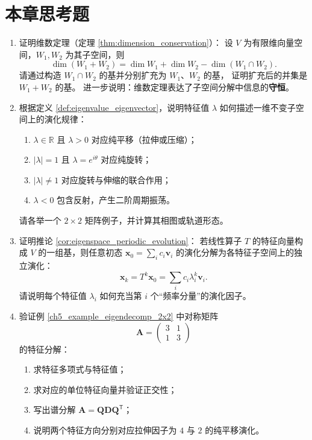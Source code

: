 \section*{本章思考题}

\begin{enumerate}[leftmargin=3em, label=\textbf{题 \arabic*}]
    \item 证明维数定理（定理 \ref{thm:dimension_conservation}）：
    设 $V$ 为有限维向量空间，$W_1,W_2$ 为其子空间，则
    \[
    \dim(W_1+W_2)=\dim W_1+\dim W_2-\dim(W_1\cap W_2).
    \]
    请通过构造 $W_1\cap W_2$ 的基并分别扩充为 $W_1$、$W_2$ 的基，
    证明扩充后的并集是 $W_1+W_2$ 的基。
    进一步说明：维数定理表达了子空间分解中信息的\textbf{守恒}。

    \item 根据定义 \ref{def:eigenvalue_eigenvector}，说明特征值 $\lambda$ 如何描述一维不变子空间上的演化规律：
    \begin{enumerate}[label=(\roman*)]
        \item $\lambda\in\mathbb{R}$ 且 $\lambda>0$ 对应纯平移（拉伸或压缩）；
        \item $|\lambda|=1$ 且 $\lambda=e^{i\theta}$ 对应纯旋转；
        \item $|\lambda|\neq1$ 对应旋转与伸缩的联合作用；
        \item $\lambda<0$ 包含反射，产生二阶周期振荡。
    \end{enumerate}
    请各举一个 $2\times2$ 矩阵例子，并计算其相图或轨道形态。

    \item 证明推论 \ref{cor:eigenspace_periodic_evolution}：
    若线性算子 $T$ 的特征向量构成 $V$ 的一组基，则任意初态
    $\mathbf{x}_0=\sum_i c_i\mathbf{v}_i$ 的演化分解为各特征子空间上的独立演化：
    \[
    \mathbf{x}_k=T^k\mathbf{x}_0=\sum_i c_i\lambda_i^k\mathbf{v}_i.
    \]
    请说明每个特征值 $\lambda_i$ 如何充当第 $i$ 个“频率分量”的演化因子。

    \item 验证例 \ref{ch5_example_eigendecomp_2x2} 中对称矩阵
    \[
    \mathbf{A}=\begin{pmatrix}3&1\\1&3\end{pmatrix}
    \]
    的特征分解：
    \begin{enumerate}[label=(\roman*)]
        \item 求特征多项式与特征值；
        \item 求对应的单位特征向量并验证正交性；
        \item 写出谱分解 $\mathbf{A}=\mathbf{Q}\mathbf{D}\mathbf{Q}^{\mathsf T}$；
        \item 说明两个特征方向分别对应拉伸因子为 $4$ 与 $2$ 的纯平移演化。
    \end{enumerate}


\end{enumerate}
